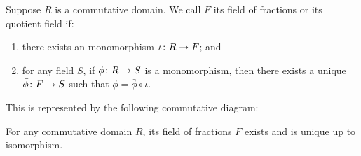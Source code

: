 \begin{definition}
    Suppose \(R\) is a commutative domain.
    We call \(F\) its field of fractions or its quotient field if:
    \begin{enumerate}[label={(\roman*)}, itemsep=0mm]
        \item there exists an monomorphism \(\iota\colon R\to F\); and
        \item for any field \(S\), if \(\phi\colon R\to S\) is a monomorphism,
            then there exists a unique \(\bar{\phi}\colon F\to S\)
            such that \(\phi = \bar{\phi}\circ\iota\).
    \end{enumerate}
    This is represented by the following commutative diagram:
    \begin{center}
    \end{center}
\end{definition}
\begin{theorem}
    For any commutative domain \(R\),
    its field of fractions \(F\) exists and is unique up to isomorphism.
\end{theorem}
